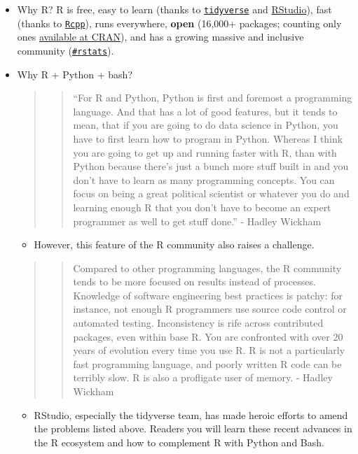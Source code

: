 \documentclass[
]{book}
\providecommand{\tightlist}{%
  \setlength{\itemsep}{0pt}\setlength{\parskip}{0pt}}
\begin{document}
\begin{itemize}
\item
  Why R? R is free, easy to learn (thanks to \href{https://www.tidyverse.org/}{\texttt{tidyverse}} and \href{https://rstudio.com/}{RStudio}), fast (thanks to \href{https://cran.r-project.org/web/packages/Rcpp/index.html}{\texttt{Rcpp}}), runs everywhere, \textbf{open} (16,000+ packages; counting only ones \href{https://cran.r-project.org/web/packages/}{available at CRAN}), and has a growing massive and inclusive community (\href{https://twitter.com/search?q=\%23rstats\&src=typed_query}{\texttt{\#rstats}}).
\item
  Why R + Python + bash?

  \begin{quote}
  \begin{quote}
  ``For R and Python, Python is first and foremost a programming language. And that has a lot of good features, but it tends to mean, that if you are going to do data science in Python, you have to first learn how to program in Python. Whereas I think you are going to get up and running faster with R, than with Python because there's just a bunch more stuff built in and you don't have to learn as many programming concepts. You can focus on being a great political scientist or whatever you do and learning enough R that you don't have to become an expert programmer as well to get stuff done.'' - Hadley Wickham
  \end{quote}
  \end{quote}

  \begin{itemize}
  \tightlist
  \item
    However, this feature of the R community also raises a challenge.
  \end{itemize}

  \begin{quote}
  \begin{quote}
  Compared to other programming languages, the R community tends to be more focused on results instead of processes. Knowledge of software engineering best practices is patchy: for instance, not enough R programmers use source code control or automated testing. Inconsistency is rife across contributed packages, even within base R. You are confronted with over 20 years of evolution every time you use R. R is not a particularly fast programming language, and poorly written R code can be terribly slow. R is also a profligate user of memory. - Hadley Wickham
  \end{quote}
  \end{quote}

  \begin{itemize}
  \tightlist
  \item
    RStudio, especially the tidyverse team, has made heroic efforts to amend the problems listed above. Readers you will learn these recent advances in the R ecosystem and how to complement R with Python and Bash.
  \end{itemize}
\end{itemize}
\end{document}
